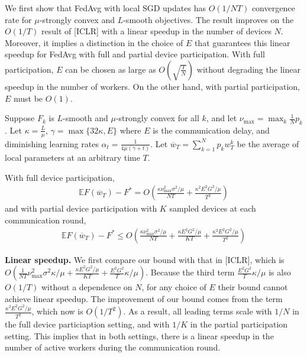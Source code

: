 We first show that FedAvg with local SGD updates has $O(1/NT)$ convergence
rate for $\mu$-strongly convex and $L$-smooth objectives. The result
improves on the $O(1/T)$ result of {[}ICLR{]} with a linear speedup
in the number of devices $N$. Moreover, it implies a distinction
in the choice of $E$ that guarantees this linear speedup for FedAvg
with full and partial device participation. With full participation,
$E$ can be chosen as large as $O(\sqrt{\frac{T}{N}})$ without degrading
the linear speedup in the number of workers. On the other hand, with
partial participation, $E$ must be $O(1)$. 
\begin{theorem}
	Suppose $F_{k}$ is $L$-smooth and $\mu$-strongly convex for all
	$k$, and let $\nu_{\max}=\max_{k}\frac{1}{N}p_{k}$. Let $\kappa=\frac{L}{\mu}$,
	$\gamma=\max\{32\kappa,E\}$ where $E$ is the communication delay,
	and diminishing learning rates $\alpha_{t}=\frac{1}{4\mu(\gamma+t)}$.
	Let $\overline{w}_{T}=\sum_{k=1}^{N}p_{k}w_{T}^{k}$ be the average
	of local parameters at an arbitrary time $T$.
	
	With full device participation, 
	\begin{align*}
	\mathbb{E}F(\overline{w}_{T})-F^{\ast}=O\left(\frac{\kappa\nu_{\max}^{2}\sigma^{2}/\mu}{NT}+\frac{\kappa^{2}E^{2}G^{2}/\mu}{T^{2}}\right)
	\end{align*}
	and with partial device participation with $K$ sampled devices at
	each communication round, 
	\begin{align*}
	\mathbb{E}F(\overline{w}_{T})-F^{\ast}\leq O\left(\frac{\kappa\nu_{\max}^{2}\sigma^{2}/\mu}{NT}+\frac{\kappa E^{2}G^{2}/\mu}{KT}+\frac{\kappa^{2}E^{2}G^{2}/\mu}{T^{2}}\right)
	\end{align*}
\end{theorem}
%
\begin{remark}
	\textbf{Linear speedup. }We first compare our bound with that in {[}ICLR{]},
	which is $O(\frac{1}{NT}\nu_{\max}^{2}\sigma^{2}\kappa/\mu+\frac{\kappa E^{2}G^{2}/\mu}{KT}+\frac{E^{2}G^{2}}{T}\kappa/\mu)$.
	Because the third term $\frac{E^{2}G^{2}}{T}\kappa/\mu$ is also $O(1/T)$
	without a dependence on $N$, for any choice of $E$ their bound cannot
	achieve linear speedup. The improvement of our bound comes from the
	term $\frac{\kappa^{2}E^{2}G^{2}/\mu}{T^{2}}$, which now is $O(1/T^{2})$.
	As a result, all leading terms scale with $1/N$ in the full device
	particiaption setting, and with $1/K$ in the partial participation
	setting. This implies that in both settings, there is a linear speedup
	in the number of active workers during the communication round.
\end{remark}
